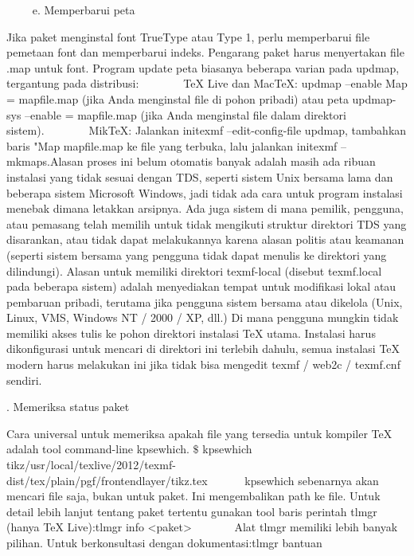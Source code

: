 {\fontsize{14pt}{14pt}\selectfont ~~~~ e. Memperbarui peta }\par

Jika paket menginstal font TrueType atau Type 1, perlu memperbarui file pemetaan font dan memperbarui indeks. Pengarang paket harus menyertakan file .map untuk font. Program update peta biasanya beberapa varian pada updmap, tergantung pada distribusi:        TeX Live dan MacTeX: updmap --enable Map = mapfile.map (jika Anda menginstal file di pohon pribadi) atau peta updmap-sys --enable = mapfile.map (jika Anda menginstal file dalam direktori sistem).        MikTeX: Jalankan initexmf --edit-config-file updmap, tambahkan baris "Map mapfile.map ke file yang terbuka, lalu jalankan initexmf --mkmaps.Alasan proses ini belum otomatis banyak adalah masih ada ribuan instalasi yang tidak sesuai dengan TDS, seperti sistem Unix bersama lama dan beberapa sistem Microsoft Windows, jadi tidak ada cara untuk program instalasi menebak dimana letakkan arsipnya. Ada juga sistem di mana pemilik, pengguna, atau pemasang telah memilih untuk tidak mengikuti struktur direktori TDS yang disarankan, atau tidak dapat melakukannya karena alasan politis atau keamanan (seperti sistem bersama yang pengguna tidak dapat menulis ke direktori yang dilindungi). Alasan untuk memiliki direktori texmf-local (disebut texmf.local pada beberapa sistem) adalah menyediakan tempat untuk modifikasi lokal atau pembaruan pribadi, terutama jika pengguna sistem bersama atau dikelola (Unix, Linux, VMS, Windows NT / 2000 / XP, dll.) Di mana pengguna mungkin tidak memiliki akses tulis ke pohon direktori instalasi TeX utama. Instalasi harus dikonfigurasi untuk mencari di direktori ini terlebih dahulu, semua instalasi TeX modern harus melakukan ini jika tidak bisa mengedit texmf / web2c / texmf.cnf sendiri.\par

. Memeriksa status paket\par

Cara universal untuk memeriksa apakah file yang tersedia untuk kompiler TeX adalah tool command-line kpsewhich. $\$$  kpsewhich tikz/usr/local/texlive/2012/texmf-dist/tex/plain/pgf/frontendlayer/tikz.tex~~~~~~ kpsewhich sebenarnya akan mencari file saja, bukan untuk paket. Ini mengembalikan path ke file. Untuk detail lebih lanjut tentang paket tertentu gunakan tool baris perintah tlmgr (hanya TeX Live):tlmgr info <paket>~~~~~~~ Alat tlmgr memiliki lebih banyak pilihan. Untuk berkonsultasi dengan dokumentasi:tlmgr bantuan\par

